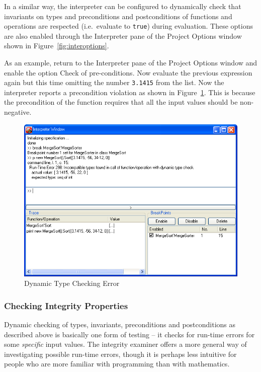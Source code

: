 \documentclass[\pformat,12pt]{article}
\newcommand{\aaa}{\tt }
\newcommand{\guicmd}[1]{{\sf #1}}
\begin{document}
In a similar way, the interpreter can be configured to dynamically
check that invariants on types and preconditions and postconditions of
functions and operations are respected (i.e.\ evaluate to {\aaa true})
during evaluation. These options are also enabled through the
\guicmd{Interpreter} pane of the \guicmd{Project Options} window 
shown in Figure~\ref{fig:interoptions}.

As an example, return to the \guicmd{Interpreter} pane of the
\guicmd{Project Options} window and enable the option \guicmd{Check of
  pre-conditions}. Now evaluate the previous expression again but this
time omitting the number {\tt 3.1415} from the list. Now the
interpreter reports a precondition violation as shown in
Figure~\ref{fig:dtcerror}. This is because the precondition of the
function \ifthenelse{\boolean{VDMsl}}{{\aaa Merge}}{{\aaa
    MergeSort`Merge}} requires that all the input values 
should be non-negative.

\begin{figure}[tbh]
\begin{center}
\includegraphics[width=12.5cm]{dynamicTCError-ppENG.png}
\caption{Dynamic Type Checking Error}
\label{fig:dtcerror}
\end{center}
\end{figure}

\subsubsection{Checking Integrity Properties}\label{pogWalk}

Dynamic checking of types, invariants, preconditions and
postconditions as described above is basically one form of testing --
it checks for run-time errors for some \emph{specific} input
values. The integrity examiner offers a more general way of
investigating possible run-time errors, though it is perhaps less
intuitive for people who are more familiar with programming than with
mathematics.
\end{document}
